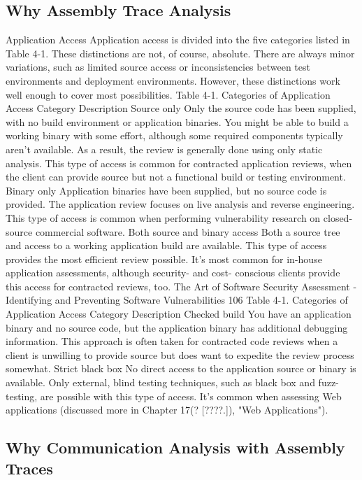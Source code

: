 \subsection{Why Assembly Trace Analysis}
Application Access Application access is divided into the five categories listed in Table 4-1. These distinctions are not, of course, absolute. There are always minor variations, such as limited source access or inconsistencies between test environments and deployment environments. However, these distinctions work well enough to cover most possibilities. Table 4-1. Categories of Application Access Category Description Source only Only the source code has been supplied, with no build environment or application binaries. You might be able to build a working binary with some effort, although some required components typically aren't available. As a result, the review is generally done using only static analysis. This type of access is common for contracted application reviews, when the client can provide source but not a functional build or testing environment. Binary only Application binaries have been supplied, but no source code is provided. The application review focuses on live analysis and reverse engineering. This type of access is common when performing vulnerability research on closed-source commercial software. Both source and binary access Both a source tree and access to a working application build are available. This type of access provides the most efficient review possible. It's most common for in-house application assessments, although security- and cost- conscious clients provide this access for contracted reviews, too. The Art of Software Security Assessment - Identifying and Preventing Software Vulnerabilities 106 Table 4-1. Categories of Application Access Category Description Checked build You have an application binary and no source code, but the application binary has additional debugging information. This approach is often taken for contracted code reviews when a client is unwilling to provide source but does want to expedite the review process somewhat. Strict black box No direct access to the application source or binary is available. Only external, blind testing techniques, such as black box and fuzz- testing, are possible with this type of access. It's common when assessing Web applications (discussed more in Chapter 17(? [????.]), "Web Applications").
\subsection{Why Communication Analysis with Assembly Traces}

